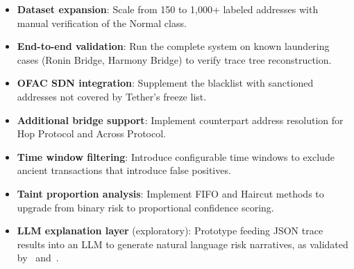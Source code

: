 \documentclass[12pt,a4paper]{article}
\begin{document}
\begin{itemize}
    \item \textbf{Dataset expansion}: Scale from 150 to 1,000+ labeled addresses with manual verification of the Normal class.
    \item \textbf{End-to-end validation}: Run the complete system on known laundering cases (Ronin Bridge, Harmony Bridge) to verify trace tree reconstruction.
    \item \textbf{OFAC SDN integration}: Supplement the blacklist with sanctioned addresses not covered by Tether's freeze list.
    \item \textbf{Additional bridge support}: Implement counterpart address resolution for Hop Protocol and Across Protocol.
    \item \textbf{Time window filtering}: Introduce configurable time windows to exclude ancient transactions that introduce false positives.
    \item \textbf{Taint proportion analysis}: Implement FIFO and Haircut methods to upgrade from binary risk to proportional confidence scoring.
    \item \textbf{LLM explanation layer} (exploratory): Prototype feeding JSON trace results into an LLM to generate natural language risk narratives, as validated by~\cite{watson2025} and~\cite{nicholls2024}.
\end{itemize}


\printbibliography
\end{document}
